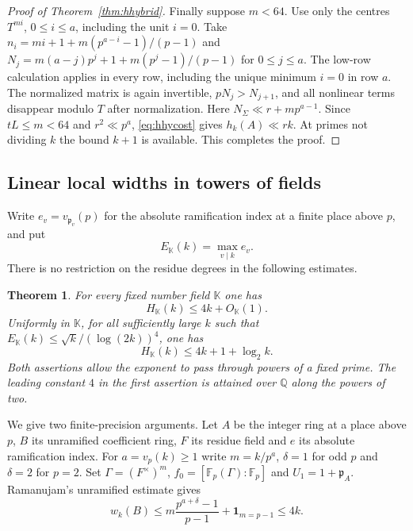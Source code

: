 \documentclass[11pt,letterpaper]{article}
\newtheorem{theorem}{Theorem}[section]
\theoremstyle{definition}
\numberwithin{equation}{section}
\begin{document}
\begin{proof}[Proof of Theorem~\ref{thm:hhybrid}]
Finally suppose $m<64$. Use only the centres $T^{mi}$,
$0\le i\le a$, including the unit $i=0$. Take
$n_i=mi+1+m(p^{a-i}-1)/(p-1)$ and
$N_j=m(a-j)p^j+1+m(p^j-1)/(p-1)$ for $0\le j\le a$.
The low-row calculation applies in every row, including the unique
minimum $i=0$ in row $a$. The normalized matrix is again invertible,
$pN_j>N_{j+1}$, and all nonlinear terms disappear modulo $T$ after
normalization. Here $N_\Sigma\ll r+mp^{a-1}$. Since $tL\le m<64$
and $r^2\ll p^a$, \eqref{eq:hhycost} gives $h_k(A)\ll rk$.
At primes not dividing $k$ the bound $k+1$ is available. This
completes the proof.
\end{proof}

\subsection{Linear local widths in towers of fields}
\label{sec:local-ramification}

Write $e_v=v_{\mathfrak p_v}(p)$ for the absolute ramification index
at a finite place above $p$, and put
\[
                 E_{\mathbb K}(k)=\max_{v\mid k} e_v .
\]
There is no restriction on the residue degrees in the following estimates.

\begin{theorem}\label{thm:local-fixed-ramification}
For every fixed number field $\mathbb K$ one has
\[
                    H_{\mathbb K}(k)\le 4k+O_{\mathbb K}(1).
\]
Uniformly in $\mathbb K$, for all sufficiently large $k$ such that
$E_{\mathbb K}(k)\le\sqrt{k}/(\log(2k))^4$, one has
\[
                    H_{\mathbb K}(k)\le4k+1+\log_2 k.
\]
Both assertions allow the exponent to pass through powers of a fixed prime.
The leading constant $4$ in the first assertion is attained over
$\mathbb Q$ along the powers of two.
\end{theorem}

We give two finite-precision arguments. Let $A$ be the integer ring at a
place above $p$, $B$ its unramified coefficient ring, $F$ its residue
field and $e$ its absolute ramification index. For $a=v_p(k)\ge1$ write
$m=k/p^a$, $\delta=1$ for odd $p$ and $\delta=2$ for $p=2$.
Set $\Gamma=(F^\times)^m$, $f_0=[\mathbb F_p(\Gamma):\mathbb F_p]$
and $U_1=1+\mathfrak p_A$. Ramanujam's unramified estimate
\cite[Prop.~1]{hram63} gives
\begin{equation}\label{eq:unramified-ordinary-count}
 w_k(B)\le m\frac{p^{a+\delta}-1}{p-1}
                     +\mathbf1_{m=p-1}\le 4k .
\end{equation}
\end{document}
